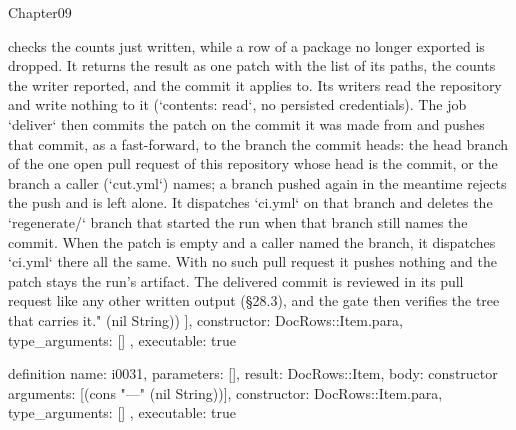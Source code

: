 \begin{lexlean}{Chapter09}
\begin{semanticmodule}
{{checks the counts just written, while a row of a package no longer exported is dropped. It returns the result as one patch with the list of its paths, the counts the writer reported, and the commit it applies to. Its writers read the repository and write nothing to it (`contents: read`, no persisted credentials). The job `deliver` then commits the patch on the commit it was made from and pushes that commit, as a fast-forward, to the branch the commit heads: the head branch of the one open pull request of this repository whose head is the commit, or the branch a caller (`cut.yml`) names; a branch pushed again in the meantime rejects the push and is left alone. It dispatches `ci.yml` on that branch and deletes the `regenerate/` branch that started the run when that branch still names the commit. When the patch is empty and a caller named the branch, it dispatches `ci.yml` there all the same. With no such pull request it pushes nothing and the patch stays the run's artifact. The delivered commit is reviewed in its pull request like any other written output (§28.3), and the gate then verifies the tree that carries it." (nil String))
    ],
    constructor: DocRows::Item.para,
    type_arguments: []
  },
  executable: true
}

definition{
  name: i0031,
  parameters: [],
  result: DocRows::Item,
  body: constructor{
    arguments: [(cons "---" (nil String))],
    constructor: DocRows::Item.para,
    type_arguments: []
  },
  executable: true
}
\end{semanticmodule}
\end{lexlean}
